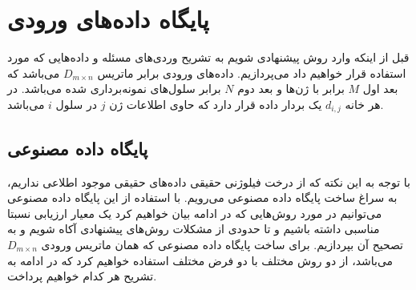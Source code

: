 \section{پایگاه داده‌های ورودی}
قبل از اینکه وارد روش پیشنهادی شویم به تشریح وردی‌های مسئله و داده‌هایی که مورد استفاده قرار خواهیم داد می‌پردازیم.
داده‌های ورودی برابر ماتریس $D_{m\times n}$ می‌باشد که بعد اول $M$ برابر با ژن‌ها و بعد دوم $N$ برابر سلول‌های نمونه‌برداری شده می‌باشد. در هر خانه $d_{i,j}$ یک بردار داده قرار دارد که حاوی اطلاعات ژن $j$ در سلول $i$ می‌باشد.

\subsection[پایگاه داده مصنوعی]
{پایگاه داده مصنوعی
}

با توجه به این نکته که از درخت فیلوژنی حقیقی داده‌های حقیقی موجود اطلاعی نداریم، به سراغ ساخت پایگاه‌ داده مصنوعی می‌رویم. با استفاده از این پایگاه داده مصنوعی می‌توانیم در مورد روش‌هایی که در ادامه بیان خواهیم کرد یک معیار ارزیابی نسبتا مناسبی داشته باشیم و تا حدودی از مشکلات روش‌های پیشنهادی آکاه شویم و به تصحیح آن بپردازیم. برای ساخت پایگاه داده مصنوعی که همان ماتریس ورودی $D_{m\times n}$ می‌باشد، از دو روش مختلف با دو فرض مختلف استفاده خواهیم کرد که در ادامه به تشریح هر کدام خواهیم پرداخت.


